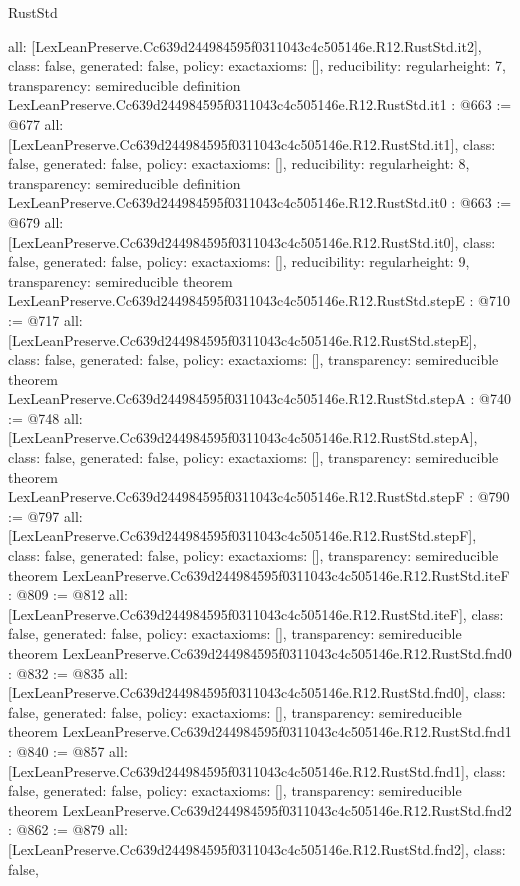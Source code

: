 \begin{lexlean}{RustStd}
\begin{coremodule}
{  all: [LexLeanPreserve.Cc639d244984595f0311043c4c505146e.R12.RustStd.it2],
  class: false,
  generated: false,
  policy: exact{axioms: []},
  reducibility: regular{height: 7},
  transparency: semireducible
}
definition LexLeanPreserve.Cc639d244984595f0311043c4c505146e.R12.RustStd.it1 : @663 := @677 {
  all: [LexLeanPreserve.Cc639d244984595f0311043c4c505146e.R12.RustStd.it1],
  class: false,
  generated: false,
  policy: exact{axioms: []},
  reducibility: regular{height: 8},
  transparency: semireducible
}
definition LexLeanPreserve.Cc639d244984595f0311043c4c505146e.R12.RustStd.it0 : @663 := @679 {
  all: [LexLeanPreserve.Cc639d244984595f0311043c4c505146e.R12.RustStd.it0],
  class: false,
  generated: false,
  policy: exact{axioms: []},
  reducibility: regular{height: 9},
  transparency: semireducible
}
theorem LexLeanPreserve.Cc639d244984595f0311043c4c505146e.R12.RustStd.stepE : @710 := @717 {
  all: [LexLeanPreserve.Cc639d244984595f0311043c4c505146e.R12.RustStd.stepE],
  class: false,
  generated: false,
  policy: exact{axioms: []},
  transparency: semireducible
}
theorem LexLeanPreserve.Cc639d244984595f0311043c4c505146e.R12.RustStd.stepA : @740 := @748 {
  all: [LexLeanPreserve.Cc639d244984595f0311043c4c505146e.R12.RustStd.stepA],
  class: false,
  generated: false,
  policy: exact{axioms: []},
  transparency: semireducible
}
theorem LexLeanPreserve.Cc639d244984595f0311043c4c505146e.R12.RustStd.stepF : @790 := @797 {
  all: [LexLeanPreserve.Cc639d244984595f0311043c4c505146e.R12.RustStd.stepF],
  class: false,
  generated: false,
  policy: exact{axioms: []},
  transparency: semireducible
}
theorem LexLeanPreserve.Cc639d244984595f0311043c4c505146e.R12.RustStd.iteF : @809 := @812 {
  all: [LexLeanPreserve.Cc639d244984595f0311043c4c505146e.R12.RustStd.iteF],
  class: false,
  generated: false,
  policy: exact{axioms: []},
  transparency: semireducible
}
theorem LexLeanPreserve.Cc639d244984595f0311043c4c505146e.R12.RustStd.fnd0 : @832 := @835 {
  all: [LexLeanPreserve.Cc639d244984595f0311043c4c505146e.R12.RustStd.fnd0],
  class: false,
  generated: false,
  policy: exact{axioms: []},
  transparency: semireducible
}
theorem LexLeanPreserve.Cc639d244984595f0311043c4c505146e.R12.RustStd.fnd1 : @840 := @857 {
  all: [LexLeanPreserve.Cc639d244984595f0311043c4c505146e.R12.RustStd.fnd1],
  class: false,
  generated: false,
  policy: exact{axioms: []},
  transparency: semireducible
}
theorem LexLeanPreserve.Cc639d244984595f0311043c4c505146e.R12.RustStd.fnd2 : @862 := @879 {
  all: [LexLeanPreserve.Cc639d244984595f0311043c4c505146e.R12.RustStd.fnd2],
  class: false,
}
\end{coremodule}
\end{lexlean}
